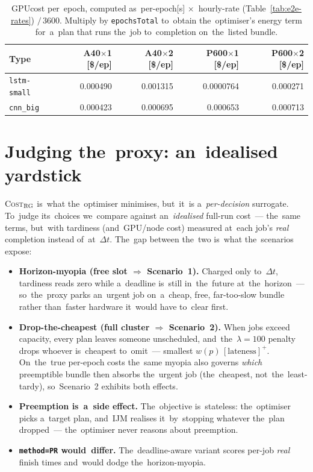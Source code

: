 \begin{table}[H]\centering\small
\begin{tabular}{l r r r r}\toprule
Type & A40$\times$1 [\$/ep] & A40$\times$2 [\$/ep] & P600$\times$1 [\$/ep] & P600$\times$2 [\$/ep] \\\midrule
\texttt{lstm-small}    & 0.000490 & 0.001315 & 0.0000764 & 0.000271 \\
\texttt{cnn\_big}      & 0.000423 & 0.000695 & 0.000653  & 0.000713 \\\bottomrule
\end{tabular}
\caption{GPUcost per~epoch, computed as~per-epoch[s]
$\times$~hourly-rate (Table~\ref{tab:e2e-rates}) $/\,3600$.  Multiply by
\texttt{epochsTotal} to~obtain the~optimiser's energy term for~a~plan
that runs the~job to~completion on~the~listed
bundle.}\label{tab:e2e-bundle-rates}
\end{table}

\section{Judging the~proxy: an~idealised yardstick}
\label{sec:e2e-proxy}

\textsc{Cost}$_\textsc{RG}$ is~what the~optimiser minimises, but~it~is
a~\emph{per-decision} surrogate.  To~judge its~choices we~compare against
an~\emph{idealised} full-run cost~--- the~same terms, but~with tardiness
(and~GPU/node cost) measured at~each job's \emph{real} completion instead
of~at~$\Delta t$.  The~gap between the~two is~what the~scenarios expose:

\begin{itemize}[leftmargin=*,itemsep=3pt,topsep=2pt]
  \item \textbf{Horizon-myopia (free slot $\Rightarrow$ Scenario~1).}  Charged only to~$\Delta t$, tardiness reads zero while a~deadline is~still in~the~future at~the~horizon~--- so~the~proxy parks an~urgent job on~a~cheap, free, far-too-slow bundle rather than~faster hardware it~would have to~clear first.
  \item \textbf{Drop-the-cheapest (full cluster $\Rightarrow$ Scenario~2).}  When jobs exceed capacity, every plan leaves someone unscheduled, and~the~$\lambda{=}100$ penalty drops whoever is~cheapest to~omit~--- smallest $w(p)\,[\text{lateness}]^{+}$.  On~the~true per-epoch costs the~same myopia also governs \emph{which} preemptible bundle then absorbs the~urgent job (the~cheapest, not~the~least-tardy), so~Scenario~2 exhibits both effects.
  \item \textbf{Preemption is~a~side effect.}  The~objective is~stateless: the~optimiser picks a~target plan, and~IJM realises it~by~stopping whatever the~plan dropped~--- the~optimiser never reasons about preemption.
  \item \textbf{\texttt{method=PR} would~differ.}  The~deadline-aware variant scores per-job \emph{real} finish times and~would dodge the~horizon-myopia.
\end{itemize}

